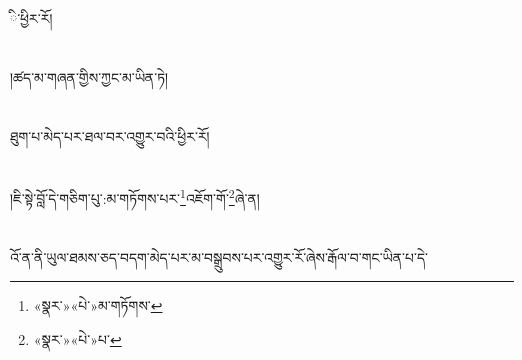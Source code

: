 ི་ཕྱིར་རོ།\chapter{ }།ཚད་མ་གཞན་གྱིས་ཀྱང་མ་ཡིན་ཏེ།\chapter{ }ཐུག་པ་མེད་པར་ཐལ་བར་འགྱུར་བའི་ཕྱིར་རོ།\chapter{ }།ཇི་སྟེ་བློ་དེ་གཅིག་པུ་:མ་གཏོགས་པར་\footnote{«སྣར་»«པེ་»མ་གཏོགས་}འཇོག་གོ་\footnote{«སྣར་»«པེ་»པ་}ཞེ་ན།\chapter{ }འོ་ན་ནི་ཡུལ་ཐམས་ཅད་བདག་མེད་པར་མ་བསྒྲུབས་པར་འགྱུར་རོ་ཞེས་རྒོལ་བ་གང་ཡིན་པ་དེ་